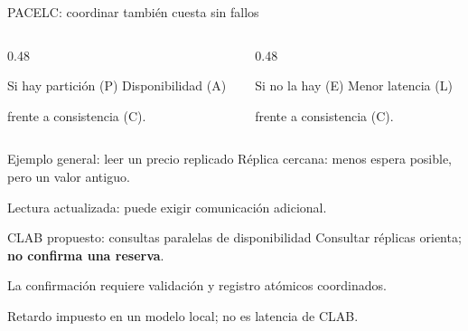 \renewcommand{\fuentespie}{Fuentes: \cite{gsAbadi2012,gsMicrosoftConsistency2025}}
\begin{frame}[label=gs-pacelc]{PACELC: coordinar también cuesta sin fallos}
  \small
  \begin{columns}[T,onlytextwidth]
    \begin{column}{0.48\textwidth}
      \begin{block}{Si hay partición (P)}
        Disponibilidad (A)\par
        frente a consistencia (C).
      \end{block}
    \end{column}
    \begin{column}{0.48\textwidth}
      \begin{block}{Si no la hay (E)}
        Menor latencia (L)\par
        frente a consistencia (C).
      \end{block}
    \end{column}
  \end{columns}
  \begin{block}{Ejemplo general: leer un precio replicado}
    Réplica cercana: menos espera posible, pero un valor antiguo.\par
    Lectura actualizada: puede exigir comunicación adicional.
  \end{block}
  \begin{block}{CLAB propuesto: consultas paralelas de disponibilidad}
    Consultar réplicas orienta; \textbf{no confirma una reserva}.\par
    La confirmación requiere validación y registro atómicos coordinados.
  \end{block}
  {\scriptsize Retardo impuesto en un modelo local; no es latencia de CLAB.
  \hyperlink{gs-evidencia-clab}{}}
\end{frame}
\renewcommand{\fuentespie}{Fuentes: [PENDIENTE]}


